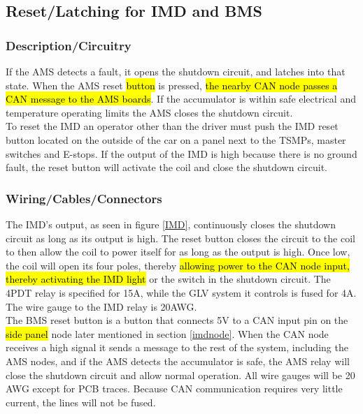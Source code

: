 \documentclass{article}
\DeclareRobustCommand{\hlr}[1]{{\sethlcolor{red}\hl{#1}}}
\begin{document}
    \subsection{Reset/Latching for IMD and BMS}

        \subsubsection{Description/Circuitry}


            If the AMS detects a fault, it opens the shutdown circuit, and latches into that state. When the AMS reset \hlr{button} is pressed, \hlr{the nearby CAN node passes a CAN message to the AMS boards}. If the accumulator is within safe electrical and temperature operating limits the AMS closes the shutdown circuit.\\

           To reset the IMD an operator other than the driver must push the IMD reset button located on the outside of the car on a panel next to the TSMPs, master switches and E-stops. If the output of the IMD is high because there is no ground fault, the reset button will activate the coil and close the shutdown circuit.

        \subsubsection{Wiring/Cables/Connectors}

            The IMD's output, as seen in figure \ref{IMD}, continuously closes the shutdown circuit as long as its output is high. The reset button closes the circuit to the coil to then allow the coil to power itself for as long as the output is high. Once low, the coil will open its four poles, thereby \hlr{allowing power to the CAN node input, thereby activating the IMD light} or the switch in the shutdown circuit. The 4PDT relay is specified for 15A, while the GLV system it controls is fused for 4A. The wire gauge to the IMD relay is 20AWG.\\

            The BMS reset button is a button that connects 5V to a CAN input pin on the \hlr{side panel} node later mentioned in section \ref{imdnode}. When the CAN node receives a high signal it sends a message to the rest of the system, including the AMS nodes, and if the AMS detects the accumulator is safe, the AMS relay will close the shutdown circuit and allow normal operation. All wire gauges will be 20 AWG except for PCB traces. Because CAN communication requires very little current, the lines will not be fused.\\
\end{document}
